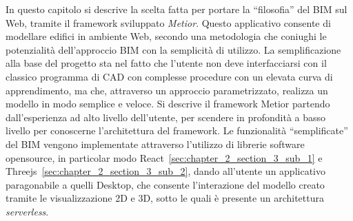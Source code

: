 In questo capitolo si descrive la scelta fatta per portare la ``filosofia'' del BIM sul Web, tramite il framework sviluppato
\emph{Metior}.
Questo applicativo consente di modellare edifici in ambiente Web, secondo una metodologia che coniughi le potenzialità
dell’approccio BIM con la semplicità di utilizzo.
La semplificazione alla base del progetto sta nel fatto che l'utente non deve interfacciarsi con il classico programma
di CAD con complesse procedure con un elevata curva di apprendimento, ma che, attraverso un approccio parametrizzato,
realizza un modello in modo semplice e veloce.
Si descrive il framework Metior partendo dall'esperienza ad alto livello dell'utente, per scendere in profondità
a basso livello per conoscerne l'architettura del framework.
Le funzionalità ``semplificate'' del BIM vengono implementate attraverso l'utilizzo di librerie software opensource,
in particolar modo React~\ref{sec:chapter_2_section_3_sub_1}
 e Threejs~\ref{sec:chapter_2_section_3_sub_2}, dando all'utente un applicativo paragonabile a quelli
Desktop, che consente l'interazione del modello creato tramite le visualizzazione 2D e 3D, sotto le quali
è presente un architettura \emph{serverless}.
\newpage
